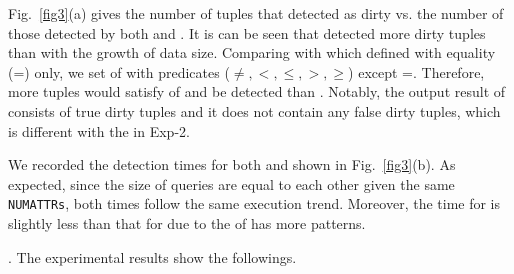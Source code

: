 Fig.~\ref{fig3}(a) gives the number of tuples that \pCINDs detected as dirty vs. the number of those detected by both \pCINDs and \CINDs. It is can be seen that \pCINDs detected more dirty tuples than \CINDs with the growth of data size. Comparing with \CINDs which defined with equality (=) only, we set \LHS of \pCINDs with predicates ($\neq, <, \leq, >, \geq$) except =. Therefore, more tuples would satisfy \LHS of \pCINDs and be detected than \CINDs. Notably, the output result of \pCINDs consists of true dirty tuples and it does not contain any false dirty tuples, which is different with the \pCFDs in Exp-2.

We recorded the detection times for both \pCINDs and \CINDs shown in Fig.~\ref{fig3}(b). As expected, since the size of queries are equal to each other given the same \texttt{NUMATTRs}, both times follow the same execution trend. Moreover, the time for \CINDs is slightly less than that for \pCINDs due to the \LHS of \pCINDs has more patterns.


. The experimental results show the followings.

